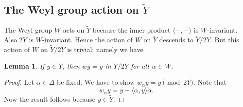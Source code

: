 \documentclass[10pt, letterpaper]{amsart}
\theoremstyle{plain}
\newtheorem{Lem}[equation]{Lemma}
\theoremstyle{definition}
\numberwithin{equation}{section}
\newcommand{\alphac}{{\check{\alpha}}}
\newcommand{\Yt}{\widetilde{Y}}
\newcommand{\la}{\langle}
\newcommand{\ra}{\rangle}
\newcommand{\ie}{{\it i.e.}\ }
\begin{document}
\subsection{The Weyl group action on $\Yt$}


The Weyl group $W$ acts on $\Yt$ because the inner product $\la-,-\ra$ is $W$-invariant. Also $2Y$ is $W$-invariant. Hence the action of $W$ on $\Yt$ descends to $\Yt\slash 2Y$. But this action of $W$ on $\Yt\slash 2Y$ is trivial; namely we have
\begin{Lem}\label{L:Yt_is_Weyl_invariant_mod_2Y}
If $y\in \Yt$, then $w y=y$ in $\Yt\slash 2Y$ for all $w\in W$.
\end{Lem}
\begin{proof}
Let $\alpha\in\Delta$ be fixed. We have to show $w_\alpha y=y\pmod{2Y}$. Note that
\begin{equation*}
    w_{\alpha}y = y-\langle\alpha,y\rangle\alphac.
\end{equation*}
Now the result follows because $y\in \Yt$.

\end{proof}
\end{document}
